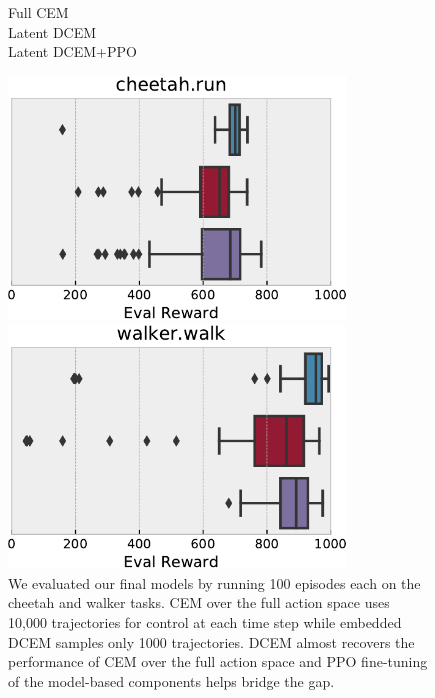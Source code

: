 \documentclass{article}
\begin{document}
\begin{figure}[t]
  \centering
  \begin{minipage}{0.24\linewidth}
    \raggedleft
    \vspace{-2mm}
    Full CEM \\[5mm]
    Latent DCEM \\[5mm]
    Latent DCEM+PPO
  \end{minipage}%
  \vspace{2mm}
  \begin{minipage}{0.37\linewidth}
  \includegraphics[width=0.8\textwidth]{planet/cheetah-rew.pdf}
  \end{minipage}%
  \begin{minipage}{0.37\linewidth}
  \includegraphics[width=0.8\textwidth]{planet/walker-rew.pdf}
  \end{minipage}%
  \caption{
    We evaluated our final models by running 100 episodes each
    on the cheetah and walker tasks.
    CEM over the full action space uses 10,000 trajectories
    for control at each time step while embedded DCEM
    samples only 1000 trajectories.
    DCEM almost recovers the performance of CEM over the
    full action space and PPO fine-tuning of the model-based
    components helps bridge the gap.
  }
  \label{fig:dmc:rew}
\end{figure}
\end{document}
